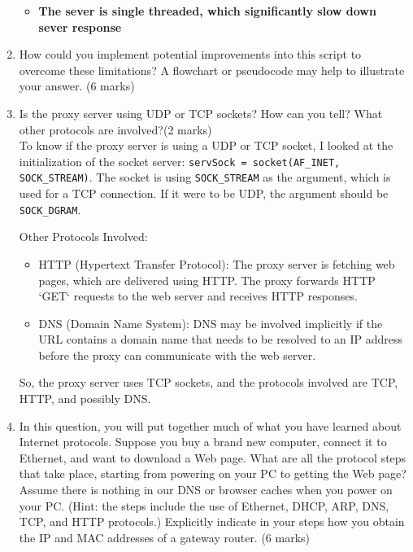 \documentclass[11pt]{article}
\begin{document}
\begin{enumerate}
\begin{itemize}
				\item \textbf{The sever is single threaded, which significantly slow down sever response}\\
			\end{itemize}
		
		\item How could you implement potential improvements into this script to overcome these limitations? A flowchart or pseudocode may help to illustrate your answer. (6 marks)
		
		\item Is the proxy server using UDP or TCP sockets? How can you tell? What other protocols are involved?(2 marks)\\
		To know if the proxy server is using a UDP or TCP socket, I looked at the initialization of the socket server: \texttt{servSock = socket(AF\_INET, SOCK\_STREAM)}. The socket is using \texttt{SOCK\_STREAM} as the argument, which is used for a TCP connection. If it were to be UDP, the argument should be \texttt{SOCK\_DGRAM}.
		
		Other Protocols Involved:
		
			\begin{itemize}
				\item HTTP (Hypertext Transfer Protocol): The proxy server is fetching web pages, which are delivered using HTTP. The proxy forwards HTTP `GET` requests to the web server and receives HTTP responses.
				\item DNS (Domain Name System): DNS may be involved implicitly if the URL contains a domain name that needs to be resolved to an IP address before the proxy can communicate with the web server.
			\end{itemize}
		So, the proxy server uses TCP sockets, and the protocols involved are TCP, HTTP, and possibly DNS.
		
		\item In this question, you will put together much of what you have learned about Internet protocols. Suppose you buy a brand new computer, connect it to Ethernet, and want to download a Web page. What are all the protocol steps that take place, starting from powering on your PC to getting the Web page? Assume there is nothing in our DNS or browser caches when you power on your PC. (Hint: the steps include the use of Ethernet, DHCP, ARP, DNS, TCP, and HTTP protocols.) Explicitly indicate in your steps how you obtain the IP and MAC addresses of a gateway router. (6 marks)\\
		

\end{enumerate}
\end{document}
